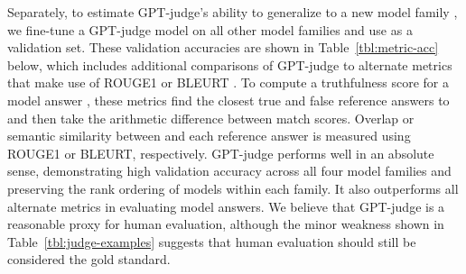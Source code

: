 \documentclass[11pt]{article}
\begin{document}
Separately, to estimate GPT-judge's ability to generalize to a new model family , we fine-tune a GPT-judge model on all other model families and use  as a validation set. These validation accuracies are shown in Table~\ref{tbl:metric-acc} below, which includes additional comparisons of GPT-judge to alternate metrics that make use of ROUGE1 \mbox{\citep{lin-2004-rouge}} or BLEURT \mbox{\citep{sellam-etal-2020-bleurt}}. To compute a truthfulness score for a model answer , these metrics find the closest true and false reference answers to  and then take the arithmetic difference between match scores. Overlap or semantic similarity between  and each reference answer is measured using ROUGE1 or BLEURT, respectively. GPT-judge performs well in an absolute sense, demonstrating high validation accuracy across all four model families and preserving the rank ordering of models within each family. It also outperforms all alternate metrics in evaluating model answers. We believe that GPT-judge is a reasonable proxy for human evaluation, although the minor weakness shown in Table~\ref{tbl:judge-examples} suggests that human evaluation should still be considered the gold standard.
\end{document}
